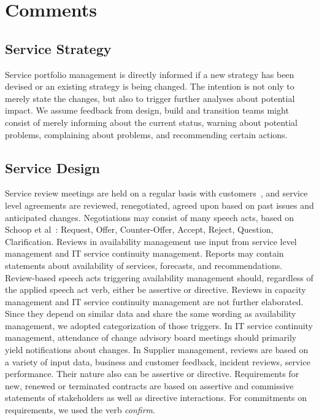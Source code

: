 \section{Comments}

\subsection{Service Strategy~\cite{ITILServiceStrategy}}
Service portfolio management is directly informed
if a new strategy has been devised or an existing strategy is being changed.
The intention is not only to merely state the changes,
but also to trigger further analyses about potential impact.
We assume feedback from design, build and transition teams
might consist of
merely informing about the current status,
warning about potential problems,
complaining about problems,
and recommending certain actions.


\subsection{Service Design~\cite{ITILServiceDesign}}
Service review meetings are held on a regular basis with customers~\cite[p. 116]{ITILServiceDesign},
and service level agreements are reviewed, renegotiated, agreed upon
based on past issues and anticipated changes.
Negotiations may consist of many speech acts,
\eg based on Schoop et al~\cite{SchoopJertilaList2003}:
Request, Offer, Counter-Offer, Accept, Reject, Question, Clarification.
%
Reviews in availability management use input from service level management and IT service continuity management. Reports may contain statements about availability of services, forecasts, and recommendations. Review-based speech acts triggering availability management should, regardless of the applied speech act verb, either be assertive or directive.
%
Reviews in capacity management and IT service continuity management are not further elaborated. Since they depend on similar data and share the same wording as availability management, we adopted categorization of those triggers.
%
In IT service continuity management,
attendance of change advisory board meetings should primarily yield
notifications about changes.
%
In Supplier management,
reviews are based on a variety of input data, \eg business and customer feedback, incident reviews, service performance. Their nature also can be assertive or directive.
Requirements for new, renewed or terminated contracts
are based on assertive and commissive statements of stakeholders
as well as directive interactions.
For commitments on requirements, we used the verb \emph{confirm}.

